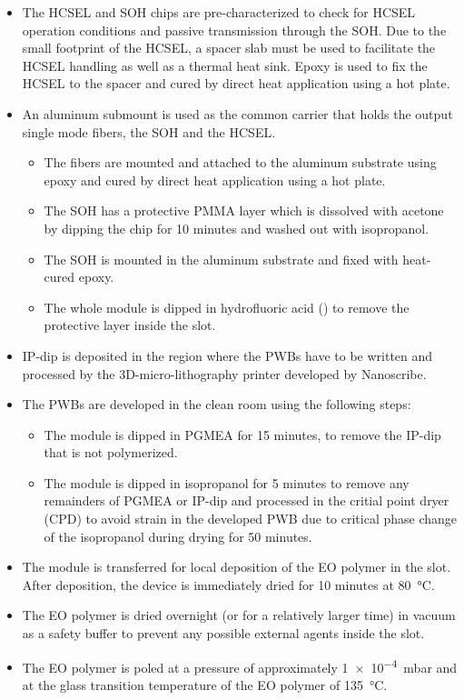 \begin{itemize}
\item The HCSEL and SOH chips are pre-characterized to check for HCSEL operation conditions and passive transmission through the SOH. Due to the small footprint of the HCSEL, a spacer slab must be used to facilitate the HCSEL handling as well as a thermal heat sink. Epoxy is used to fix the HCSEL to the spacer and cured by direct heat application using a hot plate.
\item An aluminum submount is used as the common carrier that holds the output single mode fibers, the SOH and the HCSEL.
	\begin{itemize}
	\item The fibers are mounted and attached to the aluminum substrate using epoxy and cured by direct heat application using a hot plate.
	\item The SOH has a protective PMMA layer which is dissolved with acetone by dipping the chip for 10 minutes and washed out with isopropanol. 
	\item The SOH is mounted in the aluminum substrate and fixed with heat-cured epoxy.
	\item The whole module is dipped in hydrofluoric acid () to remove the protective  layer inside the slot.
	\end{itemize}
\item IP-dip is deposited in the region where the PWBs have to be written and processed by the 3D-micro-lithography printer developed by Nanoscribe. 
\item The PWBs are developed in the clean room using the following steps:
	\begin{itemize}
		\item The module is dipped in PGMEA for 15 minutes, to remove the IP-dip that is not polymerized. 
		\item The module is dipped in isopropanol for 5 minutes to remove any remainders of PGMEA or IP-dip and processed in the critial point dryer (CPD) to avoid strain in the developed PWB due to critical phase change of the isopropanol during drying for 50 minutes.
	\end{itemize}
\item The module is transferred for local deposition of the EO polymer in the slot. After deposition, the device is immediately dried for 10 minutes at \SI{80}{\celsius}.
\item The EO polymer is dried overnight (or for a relatively larger time) in vacuum as a safety buffer to prevent any possible external agents inside the slot.
\item The EO polymer is poled at a pressure of approximately \SI{1e-4}{\milli\bar} and at the glass transition temperature of the EO polymer of \SI{135}{\celsius}.
\end{itemize}

